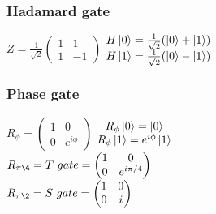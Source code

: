 \documentclass[11.5pt, paper=a4]{article}
\theoremstyle{definition}
\numberwithin{theorem}{section}
\begin{document}
\subsubsection{Hadamard gate}
    $Z = \frac{1}{\sqrt{2}}\begin{pmatrix}
    1 & 1\\
    1 & -1
    \end{pmatrix}$ $\begin{matrix}
    H\ket{0} = \frac{1}{\sqrt{2}}(\ket{0} + \ket{1})\\
    H\ket{1} = \frac{1}{\sqrt{2}}(\ket{0} - \ket{1})\\
    \end{matrix}$
\subsubsection{Phase gate}
    $R_{\phi} = \begin{pmatrix}
    1 & 0\\
    0 & e^{i\phi}
    \end{pmatrix}$ $\begin{matrix}
    R_{\phi}\ket{0} = \ket{0} \\
    R_{\phi}\ket{1} = e^{i\phi}\ket{1}
    \end{matrix}$ \\
    $R_{\pi\4} = T\ gate = \begin{pmatrix}
    1 & 0\\
    0 & e^{i\pi/4}
    \end{pmatrix}$ \\
    $R_{\pi\2} = S\ gate = \begin{pmatrix}
    1 & 0\\
    0 & i
    \end{pmatrix}$\\
\end{document}
